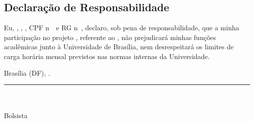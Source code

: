 
\cleardoublepage
\pagestyle{pretextual}                 %
\begin{midpage}                        %
   {\centering \section*{Declaração de Responsabilidade \label{sec:dec_responsabilidade}} }
   \vspace{1cm}
   Eu, \textbf{\pesquisador}, \pesqnacionalidade, \pesqestadocivil, CPF n\ele\ \pesqcpf\ e RG n\ele\ \pesqrg, declaro, sob pena de responsabilidade, que a minha participação no projeto \projeto, referente ao \instjuridico, não prejudicará minhas funções acadêmicas junto à Universidade de Brasília, nem desrespeitará os limites de carga horária mensal previstos nas normas internas da Universidade.
   
   \vspace{.5cm}\flushright Brasília (DF), \hoje.
   
   \begin{center}
      \vspace{2cm} \rule{8cm}{.01cm} \\
      \pesquisador \\
      \scriptsize Bolsista \\
   \end{center}
\end{midpage}


